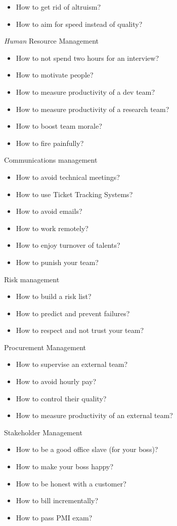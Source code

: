 \documentclass[nobrand,anonymous,nodate,nosecurity]{huawei}
\begin{document}
{\begin{lectures}
\begin{itemize}
    \item How to get rid of altruism?
    \item How to aim for speed instead of quality?
    \end{itemize}
\item \emph{Human} Resource Management
    \begin{itemize}
    \item How to not spend two hours for an interview?
    \item How to motivate people?
    \item How to measure productivity of a dev team?
    \item How to measure productivity of a research team?
    \item How to boost team morale?
    \item How to fire painfully?
    \end{itemize}
\item Communications management
    \begin{itemize}
    \item How to avoid technical meetings?
    \item How to use Ticket Tracking Systems?
    \item How to avoid emails?
    \item How to work remotely?
    \item How to enjoy turnover of talents?
    \item How to punish your team?
    \end{itemize}
\item Risk management
    \begin{itemize}
    \item How to build a risk list?
    \item How to predict and prevent failures?
    \item How to respect and not trust your team?
    \end{itemize}
\item Procurement Management
    \begin{itemize}
    \item How to supervise an external team?
    \item How to avoid hourly pay?
    \item How to control their quality?
    \item How to measure productivity of an external team?
    \end{itemize}
\item Stakeholder Management
    \begin{itemize}
    \item How to be a good office slave (for your boss)?
    \item How to make your boss happy?
    \item How to be honest with a customer?
    \item How to bill incrementally?
    \item How to pass PMI exam?
    \end{itemize}
\end{lectures}

}
\end{document}
